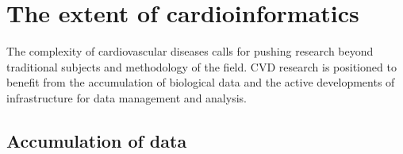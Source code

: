 \documentclass[letter]{bioinfo}
\newcommand{\comment}[1]{\textcolor{red}{#1}}
\begin{document}
	
	
	
	
	\section*{The extent of cardioinformatics}
	
	
	The complexity of cardiovascular diseases calls for pushing research beyond traditional subjects and methodology of the field. CVD research is positioned to benefit from the accumulation of biological data and the active developments of infrastructure for data management and analysis.
	
	\subsection*{Accumulation of data}
\end{document}

